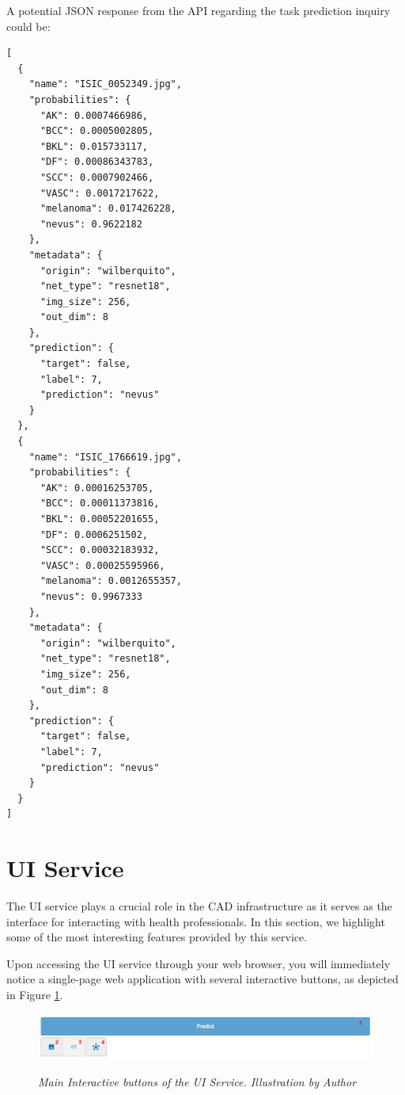 A potential JSON response from the API regarding the task prediction inquiry
could be:

\begin{Verbatim}[fontsize=\scriptsize]
[
  {
    "name": "ISIC_0052349.jpg",
    "probabilities": {
      "AK": 0.0007466986,
      "BCC": 0.0005002805,
      "BKL": 0.015733117,
      "DF": 0.00086343783,
      "SCC": 0.0007902466,
      "VASC": 0.0017217622,
      "melanoma": 0.017426228,
      "nevus": 0.9622182
    },
    "metadata": {
      "origin": "wilberquito",
      "net_type": "resnet18",
      "img_size": 256,
      "out_dim": 8
    },
    "prediction": {
      "target": false,
      "label": 7,
      "prediction": "nevus"
    }
  },
  {
    "name": "ISIC_1766619.jpg",
    "probabilities": {
      "AK": 0.00016253705,
      "BCC": 0.00011373816,
      "BKL": 0.00052201655,
      "DF": 0.0006251502,
      "SCC": 0.00032183932,
      "VASC": 0.00025595966,
      "melanoma": 0.0012655357,
      "nevus": 0.9967333
    },
    "metadata": {
      "origin": "wilberquito",
      "net_type": "resnet18",
      "img_size": 256,
      "out_dim": 8
    },
    "prediction": {
      "target": false,
      "label": 7,
      "prediction": "nevus"
    }
  }
]
\end{Verbatim}

\section{UI Service}

The UI service plays a crucial role in the CAD infrastructure as it serves as
the interface for interacting with health professionals. In this section, we
highlight some of the most interesting features provided by this service.

Upon accessing the UI service through your web browser, you will immediately
notice a single-page web application with several interactive buttons, as
depicted in Figure \ref{fig:ui-tools}.

\begin{figure}[H]
  \centering
  \includegraphics[width=\textwidth]{imatges/results/ui-tools.png}
  \caption[Main Interactive buttons of the UI Service]{\textit{Main Interactive buttons of the UI Service. Illustration by Author}}
  {\label{fig:ui-tools}}
\end{figure}

